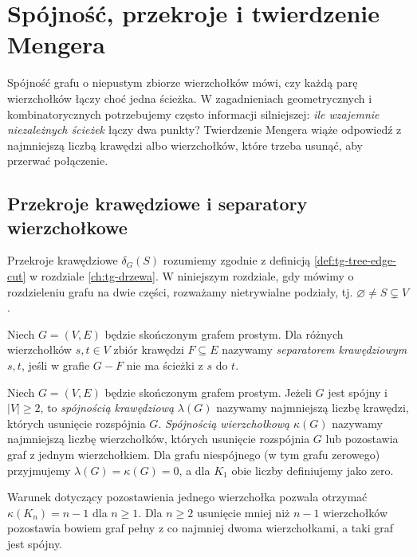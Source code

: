 \chapter{Spójność, przekroje i twierdzenie Mengera}
\label{ch:tg-menger}

Spójność grafu o niepustym zbiorze wierzchołków mówi,
czy każdą parę wierzchołków łączy choć jedna ścieżka. W zagadnieniach geometrycznych i kombinatorycznych
potrzebujemy często informacji silniejszej: \emph{ile wzajemnie
niezależnych ścieżek} łączy dwa punkty? Twierdzenie Mengera
wiąże odpowiedź z najmniejszą liczbą krawędzi albo wierzchołków,
które trzeba usunąć, aby przerwać połączenie.

\section{Przekroje krawędziowe i separatory wierzchołkowe}
\label{sec:tg-cuts}

Przekroje krawędziowe $\delta_G(S)$ rozumiemy zgodnie
z definicją \ref{def:tg-tree-edge-cut} w rozdziale
\ref{ch:tg-drzewa}. W niniejszym rozdziale, gdy mówimy
o rozdzieleniu grafu na dwie części, rozważamy nietrywialne
podziały, tj. $\varnothing\ne S\subsetneq V$.

\begin{definicja}
Niech $G=(V,E)$ będzie skończonym grafem prostym.
Dla różnych wierzchołków $s,t\in V$ zbiór krawędzi $F\subseteq E$
nazywamy \emph{separatorem krawędziowym $s,t$}, jeśli
w grafie $G-F$ nie ma ścieżki z $s$ do $t$.
\end{definicja}

\begin{definicja}
Niech $G=(V,E)$ będzie skończonym grafem prostym.
Jeżeli $G$ jest spójny i $|V|\ge2$, to
\emph{spójnością krawędziową} $\lambda(G)$ nazywamy
najmniejszą liczbę krawędzi, których usunięcie rozspójnia $G$.
\emph{Spójnością wierzchołkową} $\kappa(G)$ nazywamy
najmniejszą liczbę wierzchołków, których usunięcie
rozspójnia $G$ lub pozostawia graf z jednym wierzchołkiem.
Dla grafu niespójnego (w tym grafu zerowego)
przyjmujemy $\lambda(G)=\kappa(G)=0$,
a dla $K_1$ obie liczby definiujemy jako zero.
\end{definicja}

Warunek dotyczący pozostawienia jednego wierzchołka pozwala
otrzymać $\kappa(K_n)=n-1$ dla $n\ge1$.
Dla $n\ge2$ usunięcie mniej niż $n-1$ wierzchołków
pozostawia bowiem graf pełny z co najmniej dwoma
wierzchołkami, a taki graf jest spójny.

